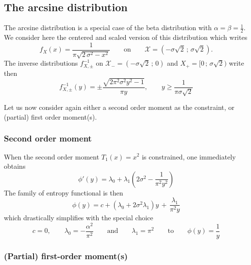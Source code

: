 \documentclass[english,sort&compress]{elsarticle}
\theoremstyle{definition}
\theoremstyle{plain}
\theoremstyle{plain}
\def\X{\mathcal{X}}
\begin{document}

\subsection{The arcsine distribution}
\label{subsec:Arcsine}

The arcsine distribution is a special case of the beta distribution with $\alpha
= \beta  = \frac12$. We  consider here the  centered and scaled version  of this
distribution which writes
%
\[
f_X(x) = \frac{1}{\pi\sqrt{ 2 \, \sigma^2 - x^2}} \qquad \mbox{on} \qquad \X = (
- \sigma \sqrt2 \, ; \, \sigma \sqrt2).
\]
%
The inverse distributions $f_{X,\pm}^{-1}$ on $\X_-  = ( - \sigma \sqrt2 \, ; \,
0 )$ and $X_+ = [ 0 \, ; \, \sigma \sqrt2 )$ write then
%
\[
f_{X,\pm}^{-1}(y) = \pm \frac{\sqrt{2 \pi^2  \sigma^2 y^2 - 1}}{\pi y}, \qquad y
\ge \frac{1}{\pi \sigma \sqrt2}
\]


Let us  now consider again  either a second  order moment as the  constraint, or
(partial) first order moment(s).



\subsubsection{Second order moment}

When  the second order  moment $T_1(x)  = x^2$  is constrained,  one immediately
obtains
%
\[
\phi'(y)=\lambda_0 + \lambda_1\left(2\sigma^{2}-\frac{1}{\pi^{2}y^{2}}\right)
\]
%
The family of entropy functional is then 
%
\[
\phi(y)  = c  +  \left( \lambda_0  +  2 \sigma^2  \lambda_1 \right)  y  \, +  \,
\frac{\lambda_1}{\pi^2 y}
\]
%
which    drastically   simplifies    with    the   special choice
%
\[
c  = 0,  \qquad \lambda_0  = -  \frac{\alpha^2}{\pi^2} \qquad  \mbox{and} \qquad
\lambda_1 = \pi^2 \qquad \mbox{to} \qquad\phi(y) = \frac{1}{y}
\]
%



\subsubsection{(Partial) first-order moment(s)}
\end{document}
